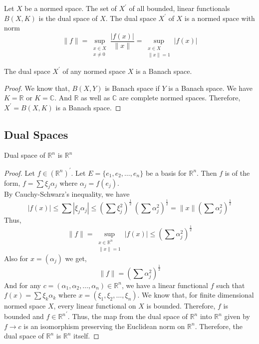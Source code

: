 \begin{definition}
	Let $X$ be a normed space.
	The set of $X^\prime$ of all bounded, linear functionals $B(X,K)$ is the dual space of $X$.
	The dual space $X^\prime$ of $X$ is a normed space with norm
	\[ \|f\| = \sup_{\substack{x \in X\\ x \ne 0}} \frac{|f(x)|}{\|x\|} = \sup_{\substack{x \in X \\ \|x\| =1 }} |f(x)| \]
\end{definition}

\begin{theorem}
	The dual space $X^\prime$ of any normed space $X$ is a Banach space.
\end{theorem}
\begin{proof}
	We know that, $B(X,Y)$ is Banach space if $Y$ is a Banach space.
	We have $K = \mathbb{R}$ or $K = \mathbb{C}$.
	And $\mathbb{R}$ as well as $\mathbb{C}$ are complete normed spaces.
	Therefore, $X^\prime = B(X,K)$ is a Banach space.
\end{proof}

\subsection{Dual Spaces}
\begin{important}
\begin{remark}
	Dual space of $\mathbb{R}^n$ is $\mathbb{R}^n$
\end{remark}
\end{important}
\begin{proof}
	Let $f \in (\mathbb{R}^n)^\prime$.
	{\color{red}Let $E = \{e_1,e_2,\dots,e_n\}$ be a basis for $\mathbb{R}^n$.}
	Then $f$ is of the form, $f = \sum \xi_j \alpha_j$ where $\alpha_j = f(e_j)$.\\

	By Cauchy-Schwarz's inequality, we have
	\[ |f(x)| \le \sum |\xi_j \alpha_j| \le \left( \sum \xi_j^2 \right)^\frac{1}{2} \ \left( \sum \alpha_j^2 \right)^\frac{1}{2} = \| x \| \left(\sum \alpha_j^2 \right)^\frac{1}{2} \]
	Thus,
	\[ \|f\| = \sup_{ \substack{x \in\mathbb{R}^n \\ \|x\|=1}} |f(x)| \le \left( \sum \alpha_j^2 \right)^\frac{1}{2} \]
	Also for $x = (\alpha_j)$ we get,
	\[ \|f\| = \left( \sum \alpha_j^2 \right)^\frac{1}{2} \]
	{\color{red}And for any $c = (\alpha_1,\alpha_2,\dots,\alpha_n) \in \mathbb{R}^n$, we have a linear functional $f$ such that $f(x) = \sum \xi_k \alpha_k$ where $x = (\xi_1,\xi_2,\dots,\xi_n)$.
	We know that, for finite dimensional normed space $X$, every linear functional on $X$ is bounded.
	Therefore, $f$ is bounded and $f \in {\mathbb{R}^n}^\prime$.
	Thus, the map from the dual space of $\mathbb{R}^n$ into $\mathbb{R}^n$ given by $f \to c$ is an isomorphism preserving the Euclidean norm on $\mathbb{R}^n$.}
	Therefore, the dual space of $\mathbb{R}^n$ is $\mathbb{R}^n$ itself.
\end{proof}


